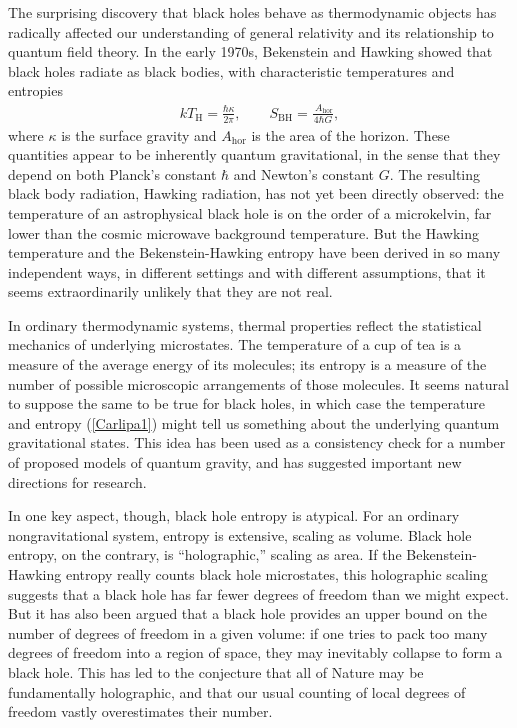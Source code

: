 \documentclass[11pt]{article}
\makeatletter
\def\section{\@startsection{section}{1}{\z@}{3.5ex plus 1ex minus
   .2ex}{2.3ex plus .2ex}{\large\bf}}
\makeatother
\begin{document}
\section{Introduction}
The surprising discovery that black holes behave as thermodynamic objects has 
radically affected our understanding of general relativity and its relationship to 
quantum field theory.  In the early 1970s, Bekenstein \cite{Bekb,Bekenstein} 
and Hawking \cite{Hawking,Hawkingc} showed that black
holes radiate as black bodies, with characteristic temperatures and entropies 
\begin{align}
kT_{\scriptscriptstyle\mathrm{H}} = \frac{\hbar\kappa}{2\pi} ,\qquad
S_{\scriptscriptstyle\mathrm{BH}}
 = \frac{\ A_{\mathrm{\scriptstyle hor}}}{4\hbar G}  ,
\label{Carlipa1}
\end{align}
where $\kappa$ is the surface gravity and $A_{\mathrm{\scriptstyle hor}}$
is the area of the horizon.  These quantities appear to be inherently quantum 
gravitational, in the sense that they depend on both Planck's
constant $\hbar$ and Newton's constant $G$.   The resulting black body radiation,
Hawking radiation, has not yet been directly observed: the temperature of
an astrophysical black hole is on the order of a microkelvin, far lower than
the cosmic microwave background temperature.  But the Hawking temperature and 
the Bekenstein-Hawking entropy have been derived in so many independent ways,
in different settings and with different assumptions, that it seems extraordinarily
unlikely that they are not real.

In ordinary thermodynamic systems, thermal properties reflect 
the statistical mechanics of underlying microstates.  The temperature of a cup of
tea is a measure of the average energy of its molecules; its entropy is a measure 
of the number of possible microscopic arrangements of those molecules.  It seems 
natural to suppose the same to be true for black holes, in which case the 
temperature and entropy (\ref{Carlipa1}) might tell us something about the 
underlying quantum gravitational states.  This idea has been used as a 
consistency check for a number of proposed models of quantum gravity,
and has suggested important new directions for research.  

In one key aspect, though, black hole entropy is atypical.  For an ordinary 
nongravitational system, entropy is extensive, scaling as volume.  Black 
hole entropy, on the contrary, is ``holographic,'' scaling as area.  If the 
Bekenstein-Hawking entropy really counts black hole microstates, this 
holographic scaling suggests that a black hole has far fewer degrees of 
freedom than we might expect.  But it has also been argued that a black 
hole provides an upper bound on the number of degrees of freedom in 
a given volume: if one tries to pack too many degrees of freedom into a 
region of space,  they may inevitably collapse to form a black hole.  This 
has led to the conjecture that all of Nature may be fundamentally 
holographic, and that our usual counting of local degrees of freedom 
vastly overestimates their number.
\end{document}
